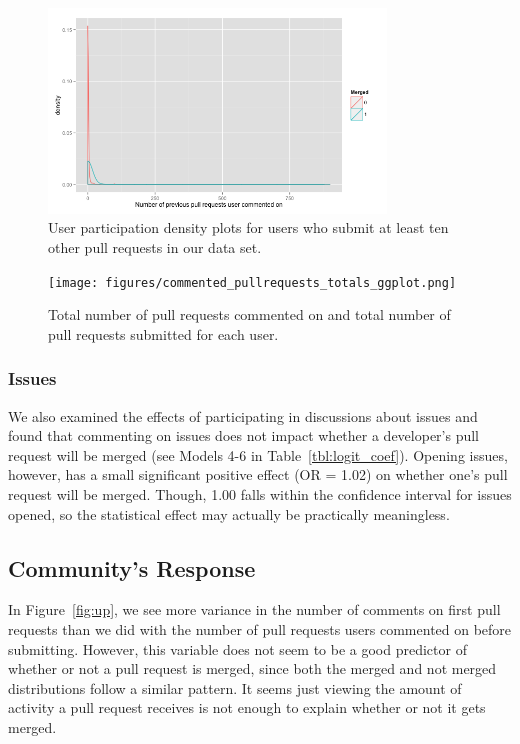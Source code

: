 \documentclass{sigchi}
\begin{document}
\begin{figure}[p] \centering
\includegraphics[width=0.8\textwidth]{figures/number_comments_density_repeaters_10_ggplot.png}
\caption{User participation density plots for users who submit at least ten
other pull requests in our data set.} \label{fig:repeaters_10} \end{figure}

\begin{figure}[htbp] \centering
\texttt{[image: figures/commented\_pullrequests\_totals\_ggplot.png]}
\caption{Total number of pull requests commented on and total number of pull
requests submitted for each user.} \label{fig:commented_pullrequests_totals}
\end{figure}

\subsubsection{Issues}

We also examined the effects of participating in discussions about issues and 
found that commenting on issues does not impact whether a developer's pull 
request will be merged (see Models 4-6 in 
Table~\ref{tbl:logit_coef}). Opening issues, however, has a small significant 
positive effect (OR = 1.02) on whether one's pull request will be merged. 
Though, 1.00 falls within the confidence interval for issues opened, so the 
statistical effect may actually be practically meaningless.

\subsection{Community's Response} 
In Figure~\ref{fig:up}, we see more variance
in the number of comments on first pull requests than we did with the number of
pull requests users commented on before submitting. However, this variable does
not seem to be a good predictor of whether or not a pull request is merged,
since both the merged and not merged distributions follow a similar pattern. It
seems just viewing the amount of activity a pull request receives is not enough
to explain whether or not it gets merged.
\end{document}
